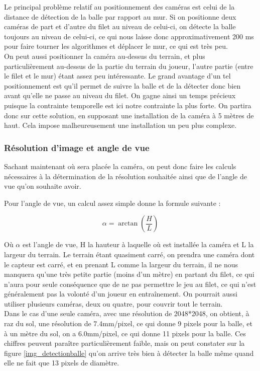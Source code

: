 Le principal problème relatif au positionnement des caméras est celui de la distance de détection de la balle par rapport au mur. Si on positionne deux caméras de part et d'autre du filet au niveau de celui-ci, on détecte la balle toujours au niveau de celui-ci, ce qui nous laisse donc approximativement 200 ms pour faire tourner les algorithmes et déplacer le mur, ce qui est très peu. \\


On peut aussi positionner la caméra au-dessus du terrain, et plus particulièrement au-dessus de la partie du terrain du joueur, l'autre partie (entre le filet et le mur) étant assez peu intéressante. Le grand avantage d'un tel positionnement est qu'il permet de suivre la balle et de la détecter donc bien avant qu'elle ne passe au niveau du filet. On gagne ainsi un temps précieux puisque la contrainte temporelle est ici notre contrainte la plus forte. On partira donc sur cette solution, en supposant une installation de la caméra à 5 mètres de haut. Cela impose malheureusement une installation un peu plus complexe.


\subsubsection{Résolution d'image et angle de vue}

Sachant maintenant où sera placée la caméra, on peut donc faire les calculs nécessaires à la détermination de la résolution souhaitée ainsi que de l'angle de vue qu'on souhaite avoir.

Pour l'angle de vue, un calcul assez simple donne la formule suivante : 

$$ \alpha = \arctan ( \frac{H}{L}) $$

Où $\alpha$ est l'angle de vue, H la hauteur à laquelle où est installée la caméra et L la largeur du terrain. Le terrain étant quasiment carré, on prendra une caméra dont le capteur est carré, et en prenant L comme la largeur du terrain, il ne nous manquera qu'une très petite partie (moins d'un mètre) en partant du filet, ce qui n'aura pour seule conséquence que de ne pas permettre le jeu au filet, ce qui n'est généralement pas la volonté d'un joueur en entraînement. On pourrait aussi utiliser plusieurs caméras, deux ou quatre, pour couvrir tout le terrain. \\ 

Dans le cas d'une seule caméra, avec une résolution de 2048*2048, on obtient, à raz du sol, une résolution de 7.4mm/pixel, ce qui donne 9 pixels pour la balle, et à un mètre du sol, on a 6.0mm/pixel, ce qui donne 11 pixels pour la balle. Ces chiffres peuvent paraître particulièrement faible, mais on peut constater sur la figure \ref{img_detectionballe} qu'on arrive très bien à détecter la balle même quand elle ne fait que 13 pixels de diamètre.


